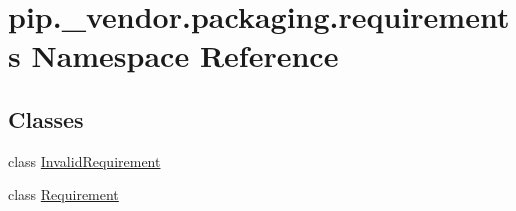 \hypertarget{namespacepip_1_1__vendor_1_1packaging_1_1requirements}{}\section{pip.\+\_\+vendor.\+packaging.\+requirements Namespace Reference}
\label{namespacepip_1_1__vendor_1_1packaging_1_1requirements}
\subsection*{Classes}
\begin{DoxyCompactItemize}
\item 
class \hyperlink{classpip_1_1__vendor_1_1packaging_1_1requirements_1_1InvalidRequirement}{Invalid\+Requirement}
\item 
class \hyperlink{classpip_1_1__vendor_1_1packaging_1_1requirements_1_1Requirement}{Requirement}
\end{DoxyCompactItemize}
